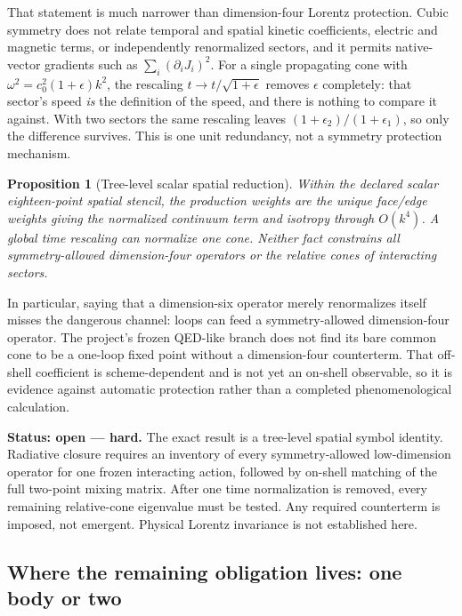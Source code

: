 \documentclass[11pt,a4paper]{article}
\theoremstyle{definition}
\theoremstyle{plain}
\newtheorem{proposition}{Proposition}
\theoremstyle{remark}
\begin{document}
That statement is much narrower than dimension-four Lorentz protection.
Cubic symmetry does not relate temporal and spatial kinetic coefficients,
electric and magnetic terms, or independently renormalized sectors, and it
permits native-vector gradients such as
$\sum_i(\partial_iJ_i)^2$. For a single propagating cone with
$\omega^2=c_0^2(1+\epsilon)k^2$, the
rescaling $t\to t/\sqrt{1+\epsilon}$ removes $\epsilon$ completely: that
sector's speed \emph{is} the definition of the speed, and there is
nothing to compare it against. With two sectors the same rescaling leaves
$(1+\epsilon_2)/(1+\epsilon_1)$, so only the difference survives. This is
one unit redundancy, not a symmetry protection mechanism.

\begin{proposition}[Tree-level scalar spatial reduction]
\label{prop:radiative}
Within the declared scalar eighteen-point spatial stencil, the production
weights are the unique face/edge weights giving the normalized continuum
term and isotropy through $O(k^4)$. A global time rescaling can normalize
one cone. Neither fact constrains all symmetry-allowed dimension-four
operators or the relative cones of interacting sectors.
\end{proposition}

\noindent In particular, saying that a dimension-six operator merely
renormalizes itself misses the dangerous channel: loops can feed a
symmetry-allowed dimension-four operator. The project's frozen
QED-like branch does not find its bare common cone to be a one-loop fixed
point without a dimension-four counterterm. That off-shell coefficient is
scheme-dependent and is not yet an on-shell observable, so it is evidence
against automatic protection rather than a completed phenomenological
calculation.

\begin{scopebox}
\textbf{Status: open --- hard.} The exact result is a tree-level spatial
symbol identity. Radiative closure requires an inventory of every
symmetry-allowed low-dimension operator for one frozen interacting action,
followed by on-shell matching of the full two-point mixing matrix. After
one time normalization is removed, every remaining relative-cone
eigenvalue must be tested. Any required counterterm is imposed, not
emergent. Physical Lorentz invariance is not established here.
\end{scopebox}

\subsection{Where the remaining obligation lives: one body or two}
\label{sec:onetwo}
\end{document}
